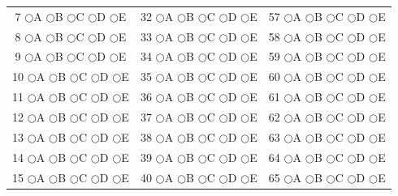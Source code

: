 \documentclass[12pt]{article}
\begin{document}
\begin{titlepage}
\begin{center}
\begin{tabular}{ccc}
7 \quad $\bigcirc$A $\bigcirc$B $\bigcirc$C $\bigcirc$D $\bigcirc$E &
32 \quad $\bigcirc$A $\bigcirc$B $\bigcirc$C $\bigcirc$D $\bigcirc$E &
57 \quad $\bigcirc$A $\bigcirc$B $\bigcirc$C $\bigcirc$D $\bigcirc$E \\

8 \quad $\bigcirc$A $\bigcirc$B $\bigcirc$C $\bigcirc$D $\bigcirc$E &
33 \quad $\bigcirc$A $\bigcirc$B $\bigcirc$C $\bigcirc$D $\bigcirc$E &
58 \quad $\bigcirc$A $\bigcirc$B $\bigcirc$C $\bigcirc$D $\bigcirc$E \\

9 \quad $\bigcirc$A $\bigcirc$B $\bigcirc$C $\bigcirc$D $\bigcirc$E &
34 \quad $\bigcirc$A $\bigcirc$B $\bigcirc$C $\bigcirc$D $\bigcirc$E &
59 \quad $\bigcirc$A $\bigcirc$B $\bigcirc$C $\bigcirc$D $\bigcirc$E \\

10 \quad $\bigcirc$A $\bigcirc$B $\bigcirc$C $\bigcirc$D $\bigcirc$E &
35 \quad $\bigcirc$A $\bigcirc$B $\bigcirc$C $\bigcirc$D $\bigcirc$E &
60 \quad $\bigcirc$A $\bigcirc$B $\bigcirc$C $\bigcirc$D $\bigcirc$E \\

11 \quad $\bigcirc$A $\bigcirc$B $\bigcirc$C $\bigcirc$D $\bigcirc$E &
36 \quad $\bigcirc$A $\bigcirc$B $\bigcirc$C $\bigcirc$D $\bigcirc$E &
61 \quad $\bigcirc$A $\bigcirc$B $\bigcirc$C $\bigcirc$D $\bigcirc$E \\

12 \quad $\bigcirc$A $\bigcirc$B $\bigcirc$C $\bigcirc$D $\bigcirc$E &
37 \quad $\bigcirc$A $\bigcirc$B $\bigcirc$C $\bigcirc$D $\bigcirc$E &
62 \quad $\bigcirc$A $\bigcirc$B $\bigcirc$C $\bigcirc$D $\bigcirc$E \\

13 \quad $\bigcirc$A $\bigcirc$B $\bigcirc$C $\bigcirc$D $\bigcirc$E &
38 \quad $\bigcirc$A $\bigcirc$B $\bigcirc$C $\bigcirc$D $\bigcirc$E &
63 \quad $\bigcirc$A $\bigcirc$B $\bigcirc$C $\bigcirc$D $\bigcirc$E \\

14 \quad $\bigcirc$A $\bigcirc$B $\bigcirc$C $\bigcirc$D $\bigcirc$E &
39 \quad $\bigcirc$A $\bigcirc$B $\bigcirc$C $\bigcirc$D $\bigcirc$E &
64 \quad $\bigcirc$A $\bigcirc$B $\bigcirc$C $\bigcirc$D $\bigcirc$E \\

15 \quad $\bigcirc$A $\bigcirc$B $\bigcirc$C $\bigcirc$D $\bigcirc$E &
40 \quad $\bigcirc$A $\bigcirc$B $\bigcirc$C $\bigcirc$D $\bigcirc$E &
65 \quad $\bigcirc$A $\bigcirc$B $\bigcirc$C $\bigcirc$D $\bigcirc$E \\


\end{tabular}
\end{center}
\end{titlepage}
\end{document}
